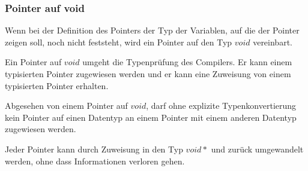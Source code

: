 	\subsubsection{Pointer auf void}
		\begin{compactitem}
			\item Wenn bei der Definition des Pointers der Typ der Variablen, auf die der Pointer zeigen soll, noch nicht feststeht, wird ein Pointer auf den Typ $void$ vereinbart.
			\item Ein Pointer auf $void$ umgeht die Typenprüfung des Compilers. Er kann einem typisierten Pointer zugewiesen werden und er kann eine Zuweisung von einem typisierten Pointer erhalten.
			\item Abgesehen von einem Pointer auf $void$, darf ohne explizite Typenkonvertierung kein Pointer auf einen Datentyp an einem Pointer mit einem anderen Datentyp zugewiesen werden.
			\item Jeder Pointer kann durch Zuweisung in den Typ $void*$ und zurück umgewandelt werden, ohne dass Informationen verloren gehen.
		\end{compactitem}

\newpage%
		
